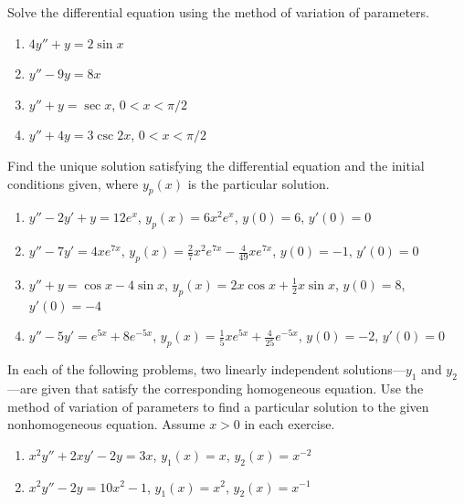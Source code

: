 \documentclass{exercises}
\begin{document}
Solve the differential equation using the method of variation of parameters.

\begin{enumerate}[resume]
\item $4y''+y=2\sin x$
\item $y''-9y=8x$
\item $y''+y=\sec x$, $0<x<\pi/2$
\item $y''+4y=3\csc 2x$, $0<x<\pi/2$
\end{enumerate}

Find the unique solution satisfying the differential equation and the initial conditions given, where $y_{p}(x)$ is the particular solution.

\begin{enumerate}[resume]
\item $y''-2y'+y=12e^{x}$, $y_{p}(x)=6x^{2}e^{x}$, $y(0)=6$, $y'(0)=0$
\item $y''-7y'=4xe^{7x}$, $y_{p}(x)=\frac{2}{7}x^{2}e^{7x}-\frac{4}{49}xe^{7x}$, $y(0)=-1$, $y'(0)=0$
\item $y''+y=\cos x-4\sin x$, $y_{p}(x)=2x\cos x+\frac{1}{2}x\sin x$, $y(0)=8$, $y'(0)=-4$
\item $y''-5y'=e^{5x}+8e^{-5x}$, $y_{p}(x)=\frac{1}{5}xe^{5x}+\frac{4}{25}e^{-5x}$, $y(0)=-2$, $y'(0)=0$
\end{enumerate}

In each of the following problems, two linearly independent solutions---$y_{1}$ and $y_{2}$---are given that satisfy the corresponding homogeneous equation. Use the method of variation of parameters to find a particular solution to the given nonhomogeneous equation. Assume $x>0$ in each exercise.

\begin{enumerate}[resume]
\item $x^{2}y''+2xy'-2y=3x$, $y_{1}(x)=x$, $y_{2}(x)=x^{-2}$
\item $x^{2}y''-2y=10x^{2}-1$, $y_{1}(x)=x^{2}$, $y_{2}(x)=x^{-1}$
\end{enumerate}
\end{document}
